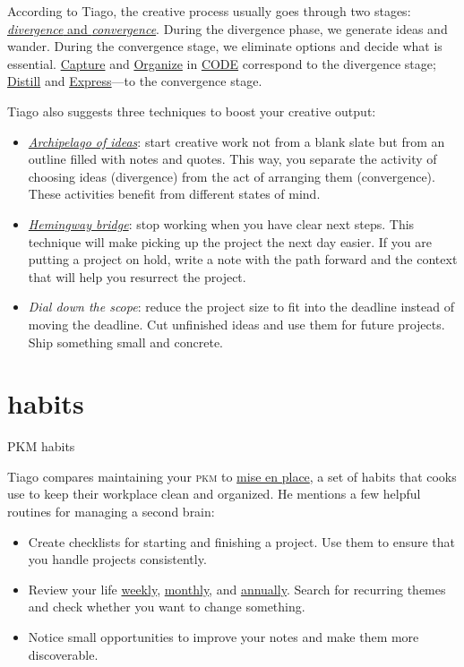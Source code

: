 \documentclass{article}
\begin{document}
According to Tiago, the creative process usually goes through two stages: \href{https://fortelabs.com/blog/divergence-and-convergence-the-two-fundamental-stages-of-the-creative-process/}{\emph{divergence} and \emph{convergence}}.
During the divergence phase, we generate ideas and wander.
During the convergence stage, we eliminate options and decide what is essential.
\href{#capture}{Capture} and \href{#organize}{Organize} in \href{#code}{CODE} correspond to the divergence stage; \href{#distill}{Distill} and \href{#express}{Express}---to the convergence stage.

Tiago also suggests three techniques to boost your creative output:
\begin{itemize}
  \item 
    \href{https://fortelabs.com/blog/just-in-time-pm-21-workflow-strategies/}{\emph{Archipelago of ideas}}: start creative work not from a blank slate but from an outline filled with notes and quotes.
    This way, you separate the activity of choosing ideas (divergence) from the act of arranging them (convergence).
    These activities benefit from different states of mind.
  \item 
    \href{https://medium.com/@mstine/day-6-how-you-can-use-hemingways-bridge-to-ship-today-s-momentum-to-tomorrow-a1af14e300ef}{\emph{Hemingway bridge}}: stop working when you have clear next steps.
    This technique will make picking up the project the next day easier.
    If you are putting a project on hold, write a note with the path forward and the context that will help you resurrect the project.
  \item 
    \emph{Dial down the scope}: reduce the project size to fit into the deadline instead of moving the deadline.
    Cut unfinished ideas and use them for future projects.
    Ship something small and concrete.
\end{itemize}

\section{habits}{PKM habits}

Tiago compares maintaining your \textsc{pkm} to \href{https://en.wikipedia.org/wiki/Mise_en_place}{mise en place}, a set of habits that cooks use to keep their workplace clean and organized.
He mentions a few helpful routines for managing a second brain:
\begin{itemize}
  \item 
    Create checklists for starting and finishing a project.
    Use them to ensure that you handle projects consistently.
  \item 
    Review your life \href{https://fortelabs.com/blog/the-weekly-review-is-an-operating-system/}{weekly}, \href{https://fortelabs.com/blog/the-monthly-review-is-a-systems-check/}{monthly}, and \href{https://fortelabs.com/blog/the-annual-review-is-a-rearchitecture/}{annually}.
    Search for recurring themes and check whether you want to change something.
  \item 
     Notice small opportunities to improve your notes and make them more discoverable.
\end{itemize}
\end{document}
